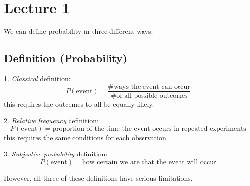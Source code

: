 \section{Lecture 1}

\textbf{}


We can define probability in three different ways:

\begin{defbox}
    \subsection{Definition (Probability)}
    1. \emph{Classical} definition:
    \[ P(\text{event})=\frac{\text{\# ways the event can occur}}
    {\text{\# of all possible outcomes}} \]
    this requires the outcomes to all be equally likely.
    
    2. \emph{Relative frequency} definition:
    \[ P(\text{event})=\text{proportion of the time the event occurs in repeated experiments} \]
    this requires the same conditions for each observation.
    
    3. \emph{Subjective probability} definition:
    \[ P(\text{event})=\text{how certain we are that the event will occur} \]
\end{defbox}
However, all three of these definitions have serious limitations.
